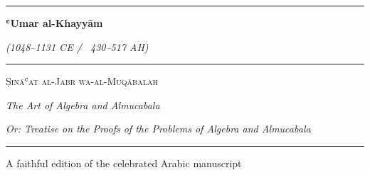 




\begin{titlepage}

\begin{center}

\vspace*{1.5cm}
{
\color{titlecolor}
\rule{\textwidth}{1.5pt}}

\vspace{1cm}

{\Huge\bfseries
\color{titlecolor} ʿUmar al-Khayyām}

\vspace{0.5cm}

{\Large\itshape (1048--1131 CE / ~430--517 AH)}

\vspace{1.5cm}

{
\color{titlecolor}
\rule{0.7\textwidth}{0.8pt}}

\vspace{1.5cm}

\begin{Arabic}

{
}

\end{Arabic}

\vspace{0.8cm}

{\LARGE\scshape Ṣināʿat al-Jabr wa-al-Muqābalah}

\vspace{0.3cm}

{\large
\textit{The Art of Algebra and Almucabala}}

\vspace{0.3cm}

{\normalsize
\textit{Or: Treatise on the Proofs of the Problems of Algebra and Almucabala}}

\vspace{1.5cm}

{
\color{titlecolor}
\rule{0.7\textwidth}{0.8pt}}

\vspace{1cm}

{\large A faithful edition of the celebrated Arabic manuscript}


\end{center}
\end{titlepage}

